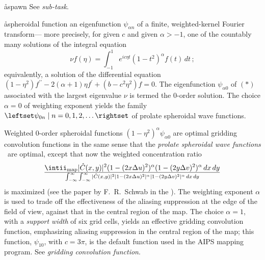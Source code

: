 \aa{spawn} See {\it sub-task}.

\aa{spheroidal function}
an eigenfunction $\psi_{\alpha n}$ of a finite,
weighted-kernel Fourier transform---%
more precisely, for given $c$ and given $\alpha>-1$,
one of the countably many solutions of the integral equation
$$\nu f(\eta)=\int_{-1}^1e^{ic\eta t}(1-t^2)^\alpha f(t)\,dt\,;\tag{$\ast$}$$
equivalently, a solution of the differential equation
$(1-\eta^2)f^{\prime\prime}-2(\alpha+1)\eta f^\prime+(b-c^2\eta^2)f=0$.
The eigenfunction $\psi_{\alpha 0}$ of $(\ast)$
associated with the largest eigenvalue $\nu$ is termed the 0-order solution.
The choice $\alpha=0$ of weighting exponent
yields the family $\leftset\psi_{0n}\mid n=0,1,2,\dotsc\rightset$
of prolate spheroidal wave functions.
\par
Weighted 0-order spheroidal functions
$(1-\eta^2)^\alpha\psi_{\alpha 0}$ are optimal
gridding convolution functions in the same sense that
the {\it prolate spheroidal wave functions} \qv\ are optimal,
except that now the weighted concentration ratio
$$\intii_{\operatorname{map}}|\hat C(x,y)|^2
(1-(2x\Delta u)^2)^\alpha (1-(2y\Delta v)^2)^\alpha\,dx\,dy\over
\int_{-\infty}^\infty\int_{-\infty}^\infty|\hat C(x,y)|^2
|1-(2x\Delta u)^2|^\alpha |1-(2y\Delta v)^2|^\alpha\,dx\,dy$$
is maximized
(see the paper by F.~R.~Schwab in the \sydp).
The weighting exponent $\alpha$ is used to trade off
the effectiveness of the aliasing suppression at the edge
of the field of view, against that in the central region of the map.
The choice $\alpha=1$, with a {\it support width} of six \uv grid cells,
yields an effective gridding convolution function,
emphasizing aliasing suppression in the central region of the map;
this function, $\psi_{10}$, with $c=3\pi$, is the default function used in the
AIPS mapping program.
See {\it gridding convolution function}.

